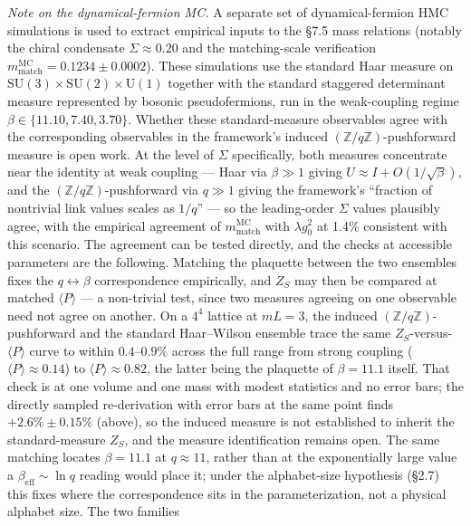 \documentclass[
]{article}
\begin{document}
\emph{Note on the dynamical-fermion MC.} A separate set of
dynamical-fermion HMC simulations is used to extract empirical inputs to
the §7.5 mass relations (notably the chiral condensate
\(\Sigma \approx 0.20\) and the matching-scale verification
\(m_{\text{match}}^{\text{MC}} = 0.1234 \pm 0.0002\)). These simulations
use the standard Haar measure on
\(\mathrm{SU}(3) \times \mathrm{SU}(2) \times \mathrm{U}(1)\) together
with the standard staggered determinant measure represented by bosonic
pseudofermions, run in the weak-coupling regime
\(\beta \in \{11.10, 7.40, 3.70\}\). Whether these standard-measure
observables agree with the corresponding observables in the framework's
induced \((\mathbb{Z}/q\mathbb{Z})\)-pushforward measure is open work.
At the level of \(\Sigma\) specifically, both measures concentrate near
the identity at weak coupling --- Haar via \(\beta \gg 1\) giving
\(U \approx I + O(1/\sqrt\beta)\), and the
\((\mathbb{Z}/q\mathbb{Z})\)-pushforward via \(q \gg 1\) giving the
framework's ``fraction of nontrivial link values scales as \(1/q\)'' ---
so the leading-order \(\Sigma\) values plausibly agree, with the
empirical agreement of \(m_{\text{match}}^{\text{MC}}\) with
\(\lambda g_0^2\) at 1.4\% consistent with this scenario. The agreement
can be tested directly, and the checks at accessible parameters are the
following. Matching the plaquette between the two ensembles fixes the
\(q \leftrightarrow \beta\) correspondence empirically, and \(Z_S\) may
then be compared at matched \(\langle P\rangle\) --- a non-trivial test,
since two measures agreeing on one observable need not agree on another.
On a \(4^4\) lattice at \(mL = 3\), the induced
\((\mathbb{Z}/q\mathbb{Z})\)-pushforward and the standard Haar--Wilson
ensemble trace the same \(Z_S\)-versus-\(\langle P\rangle\) curve to
within \(0.4\)--\(0.9\%\) across the full range from strong coupling
(\(\langle P\rangle \approx 0.14\)) to
\(\langle P\rangle \approx 0.82\), the latter being the plaquette of
\(\beta = 11.1\) itself. That check is at one volume and one mass with
modest statistics and no error bars; the directly sampled re-derivation
with error bars at the same point finds \(+2.6\% \pm 0.15\%\) (above),
so the induced measure is not established to inherit the
standard-measure \(Z_S\), and the measure identification remains open.
The same matching locates \(\beta = 11.1\) at \(q \approx 11\), rather
than at the exponentially large value a
\(\beta_{\text{eff}} \sim \ln q\) reading would place it; under the
alphabet-size hypothesis (§2.7) this fixes where the correspondence sits
in the parameterization, not a physical alphabet size. The two families
\end{document}
